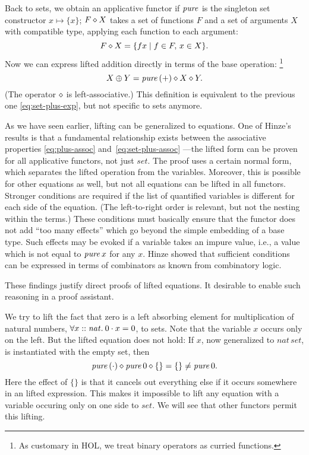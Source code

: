 \addtocounter{example}{-1}
\begin{example}[continued]
Back to sets, we obtain an applicative functor if $\operatorname{\mathit{pure}}$ is the singleton set
constructor $x \mapsto \{x\}$;
$F \diamond X$ takes a set of functions $F$ and a set of arguments $X$
with compatible type, applying each function to each argument:
\begin{equation}\label{eq:set-ap}
	F \diamond X = \{f x\mid f \in F,\, x \in X\}.
\end{equation}
Now we can express lifted addition directly in terms of the base operation:%
\footnote{As customary in HOL, we treat binary operators as curried functions.}
\begin{equation}\label{eq:set-plus}
	X \oplus Y = \operatorname{\mathit{pure}}{(+)} \diamond X \diamond Y.
\end{equation}
(The operator $\diamond$ is left-associative.)
This definition is equivalent to the previous one \eqref{eq:set-plus-exp},
but not specific to sets anymore.
\end{example}

As we have seen earlier, lifting can be generalized to equations.
One of Hinze's results is that a fundamental relationship exists between the
associative properties \eqref{eq:plus-assoc} and~\eqref{eq:set-plus-assoc}%
---the lifted form can be proven for all applicative functors, not just
$\mathit{set}$.
The proof uses a certain normal form, which separates the lifted operation from
the variables.
Moreover, this is possible for other equations as well, but not all equations
can be lifted in all functors.
Stronger conditions are required if the list of quantified variables is
different for each side of the equation.
(The left-to-right order is relevant, but not the nesting within the terms.)
These conditions must basically ensure that the functor does not add ``too many
effects'' which go beyond the simple embedding of a base type.
Such effects may be evoked if a variable takes an impure value, i.e., a value
which is not equal to $\operatorname{\mathit{pure}} x$ for any $x$.
Hinze showed that sufficient conditions can be expressed in terms of combinators
as known from combinatory logic.

These findings justify direct proofs of lifted equations.
It desirable to enable such reasoning in a proof assistant.

\begin{example}\label{exmp:set-counterexmp}
We try to lift the fact that zero is a left absorbing element for
multiplication of natural numbers, $\forall x \mathrel{::} \mathit{nat}.\>0 \cdot x = 0$,
to sets.
Note that the variable $x$ occurs only on the left.
But the lifted equation does not hold: If $x$, now generalized to
$\mathit{nat}\,\mathit{set}$, is instantiated with the empty set, then
\[ \operatorname{\mathit{pure}}{(\cdot)} \diamond \operatorname{\mathit{pure}} 0 \diamond \{\} = \{\} \ne \operatorname{\mathit{pure}} 0. \]
Here the effect of $\{\}$ is that it cancels out everything else if it occurs
somewhere in an lifted expression.
This makes it impossible to lift any equation with a variable occuring only on
one side to $\mathit{set}$.
We will see that other functors permit this lifting.
\end{example}


